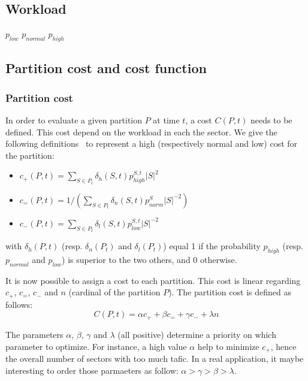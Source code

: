 \documentclass[oneside,twocolumn]{article}
\begin{document}
\subsection{Workload}\label{sub:workload}

$p_{low}$
$p_{normal}$
$p_{high}$

\subsection{Partition cost and cost function}

\subsubsection{Partition cost}

In order to evaluate a given partition $P$ at time $t$, a cost $C(P, t)$ needs
to be defined. This cost depend on the workload in each the sector. We give the
following definitions~\cite{ferrari2017} to represent a high
(respectively normal and low) cost for the partition:
\begin{itemize}
  \item $c_+(P, t) = \sum_{S \in P_t} \delta_{h}(S, t) p_{high}^{S, t} |S|^2$
  \item $c_=(P, t) = 1 / \left(
      \sum_{S \in P_t} \delta_{n}(S, t) p_{norm}^{S} |S|^{-2}
    \right)$
  \item $c_-(P, t) = \sum_{S \in P_t} \delta_{l}(S, t) p_{low}^{S, t} |S|^{-2}$
\end{itemize}
with $\delta_{h}(P, t)$ (resp. $\delta_{n}(P_t)$ and $\delta_{l}(P_t)$) equal 1
if the probability $p_{high}$ (resp. $p_{normal}$ and $p_{low}$) is superior to
the two others, and 0 otherwise.

It is now possible to assign a cost to each partition. This cost is linear
regarding $c_+$, $c_=$, $c_-$ and $n$ (cardinal of the partition $P$). The
partition cost is defined as follows:
\begin{equation}
  C(P, t) = \alpha c_+ + \beta c_= + \gamma c_- +\lambda n
\end{equation}

The parameters $\alpha$, $\beta$, $\gamma$ and $\lambda$ (all positive)
determine a priority on which parameter to optimize. For instance, a high
value $\alpha$ help to
minimize $c_+$, hence the overall number of sectors with too much tafic.
In a real application, it maybe interesting to order those parmaeters as
follow: $\alpha > \gamma > \beta > \lambda$.
\end{document}
